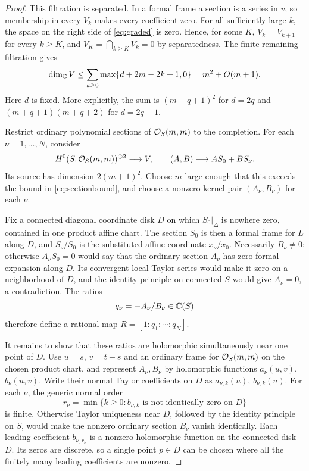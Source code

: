 \begin{proof}
This filtration is separated. In a formal frame a section is a
series in \(v\), so membership in every \(V_k\) makes every
coefficient zero. For all sufficiently large \(k\), the space on
the right side of \eqref{eq:graded} is zero. Hence, for some \(K\),
\(V_k=V_{k+1}\) for every \(k\ge K\), and
\(V_K=\bigcap_{k\ge K}V_k=0\) by separatedness. The finite remaining
filtration gives
\begin{equation}\label{eq:sectionbound}
\dim_\mathbb C V
\le\sum_{k\ge0}\max\{d+2m-2k+1,0\}
=m^2+O(m+1).
\end{equation}
Here \(d\) is fixed. More explicitly, the sum is
\((m+q+1)^2\) for \(d=2q\) and
\((m+q+1)(m+q+2)\) for \(d=2q+1\).

Restrict ordinary polynomial sections of \(\mathcal O_S(m,m)\) to the
completion. For each \(\nu=1,\ldots,N\), consider
\[
H^0(S,\mathcal O_S(m,m))^{\oplus2}\longrightarrow V,\qquad
(A,B)\longmapsto AS_0+BS_\nu.
\]
Its source has dimension \(2(m+1)^2\). Choose \(m\) large enough
that this exceeds the bound in \eqref{eq:sectionbound}, and choose
a nonzero kernel pair \((A_\nu,B_\nu)\) for each \(\nu\).

Fix a connected diagonal coordinate disk \(D\) on which
\(S_0|_\Delta\) is nowhere zero, contained in one product affine
chart. The section \(S_0\) is then a formal frame for \(L\) along
\(D\), and \(S_\nu/S_0\) is the substituted affine coordinate
\(x_\nu/x_0\). Necessarily \(B_\nu\ne0\): otherwise \(A_\nu S_0=0\)
would say that the ordinary section \(A_\nu\) has zero formal
expansion along \(D\). Its convergent local Taylor series would
make it zero on a neighborhood of \(D\), and the identity principle
on connected \(S\) would give \(A_\nu=0\), a contradiction.
The ratios
\[
q_\nu=-A_\nu/B_\nu\in\mathbb C(S)
\]
therefore define a rational map \(R=[1:q_1:\cdots:q_N]\).

It remains to show that these ratios are holomorphic simultaneously
near one point of \(D\). Use \(u=s\), \(v=t-s\) and an ordinary
frame for \(\mathcal O_S(m,m)\) on the chosen product chart, and represent
\(A_\nu,B_\nu\) by holomorphic functions \(a_\nu(u,v)\),
\(b_\nu(u,v)\). Write their normal Taylor coefficients on \(D\)
as \(a_{\nu,k}(u)\), \(b_{\nu,k}(u)\). For each \(\nu\), the
generic normal order
\[
r_\nu=\min\{k\ge0:b_{\nu,k}\text{ is not identically zero on }D\}
\]
is finite. Otherwise Taylor uniqueness near \(D\), followed by
the identity principle on \(S\), would make the nonzero ordinary
section \(B_\nu\) vanish identically. Each leading coefficient
\(b_{\nu,r_\nu}\) is a nonzero holomorphic function on the connected
disk \(D\). Its zeros are discrete, so a single point \(p\in D\)
can be chosen where all the finitely many leading coefficients are
nonzero.


\end{proof}
